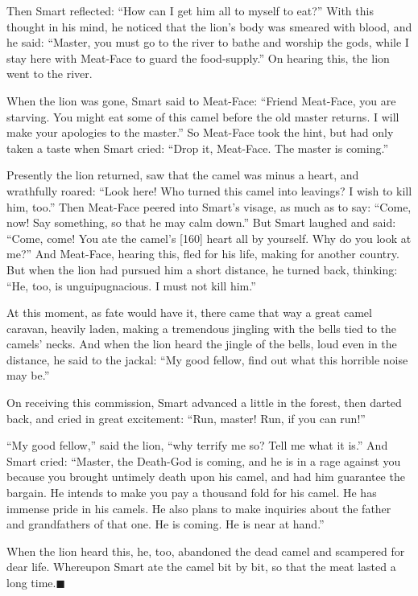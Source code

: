\documentclass[article, twoside, 14pt]{memoir}
\newcommand{\qed}{\hfill \ensuremath{\blacksquare}}
\begin{document}
Then Smart reflected: ``How can I get him all to myself to eat?''
With this thought in his mind, he noticed that the lion's body was
smeared with blood, and he said:
``Master, you must go to the river to bathe and worship the gods, while I stay here with Meat-Face to guard the food-supply.''
On hearing this, the lion went to the river.

When the lion was gone, Smart said to Meat-Face:
``Friend Meat-Face, you are starving. You might eat some of this camel before the old master returns. I will make your apologies to the master.''
So Meat-Face took the hint, but had only taken a taste when Smart
cried: ``Drop it, Meat-Face. The master is coming.''

Presently the lion returned, saw that the camel was minus a heart,
and wrathfully roared:
``Look here! Who turned this camel into leavings? I wish to kill him, too.''
Then Meat-Face peered into Smart's visage, as much as to say:
``Come, now! Say something, so that he may calm down.'' But Smart
laughed and said:
``Come, come! You ate the camel's [160] heart all by yourself. Why do you look at me?''
And Meat-Face, hearing this, fled for his life, making for another
country. But when the lion had pursued him a short distance, he
turned back, thinking:
``He, too, is unguipugnacious. I must not kill him.''

At this moment, as fate would have it, there came that way a great
camel caravan, heavily laden, making a tremendous jingling with the
bells tied to the camels' necks. And when the lion heard the jingle
of the bells, loud even in the distance, he said to the jackal:
``My good fellow, find out what this horrible noise may be.''

On receiving this commission, Smart advanced a little in the
forest, then darted back, and cried in great excitement:
``Run, master! Run, if you can run!''

``My good fellow,'' said the lion,
``why terrify me so? Tell me what it is.'' And Smart cried:
``Master, the Death-God is coming, and he is in a rage against you because you brought untimely death upon his camel, and had him guarantee the bargain. He intends to make you pay a thousand fold for his camel. He has immense pride in his camels. He also plans to make inquiries about the father and grandfathers of that one. He is coming. He is near at hand.''

When the lion heard this, he, too, abandoned the dead camel and
scampered for dear life. Whereupon Smart ate the camel bit by bit,
so that the meat lasted a long time.\hyperref[s24]{\qed}
\end{document}
